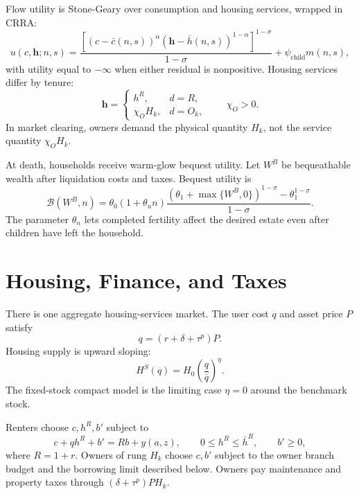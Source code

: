 \documentclass[11pt]{article}
\newcommand{\1}{\mathbf 1}
\newcommand{\Bcal}{\mathcal B}
\begin{document}
Flow utility is Stone-Geary over consumption and housing services, wrapped in
CRRA:
\begin{equation}
u(c,\mathbf h;n,s)
=
\frac{
\left[
(c-\bar c(n,s))^\alpha
(\mathbf h-\bar h(n,s))^{1-\alpha}
\right]^{1-\sigma}
}{1-\sigma}
+\psi_{\mathrm{child}}m(n,s),
\label{eq:quant_flow_utility}
\end{equation}
with utility equal to $-\infty$ when either residual is nonpositive. Housing
services differ by tenure:
\begin{equation}
\mathbf h=
\begin{cases}
h^R, & d=R,\\
\chi_O H_k, & d=O_k,
\end{cases}
\qquad
\chi_O>0.
\label{eq:quant_housing_services}
\end{equation}
In market clearing, owners demand the physical quantity $H_k$, not the service
quantity $\chi_OH_k$.

At death, households receive warm-glow bequest utility. Let $W^B$ be
bequeathable wealth after liquidation costs and taxes. Bequest utility is
\begin{equation}
\Bcal(W^B,n)
=
\theta_0(1+\theta_n n)
\frac{
(\theta_1+\max\{W^B,0\})^{1-\sigma}
-\theta_1^{1-\sigma}
}{1-\sigma}.
\label{eq:quant_bequest}
\end{equation}
The parameter $\theta_n$ lets completed fertility affect the desired estate
even after children have left the household.

\section{Housing, Finance, and Taxes}

There is one aggregate housing-services market. The user cost $q$ and asset
price $P$ satisfy
\begin{equation}
q=(r+\delta+\tau^p)P.
\label{eq:quant_user_cost}
\end{equation}
Housing supply is upward sloping:
\begin{equation}
H^S(q)=H_0\left(\frac{q}{\bar q}\right)^\eta.
\label{eq:quant_supply}
\end{equation}
The fixed-stock compact model is the limiting case $\eta=0$ around the
benchmark stock.

Renters choose $c,h^R,b'$ subject to
\begin{equation}
c+q h^R+b'=R b+y(a,z),
\qquad
0\le h^R\le \bar h^R,
\qquad
b'\ge0,
\label{eq:quant_renter_budget}
\end{equation}
where $R=1+r$. Owners of rung $H_k$ choose $c,b'$ subject to the owner branch
budget and the borrowing limit described below. Owners pay maintenance and
property taxes through $(\delta+\tau^p)PH_k$.
\end{document}
